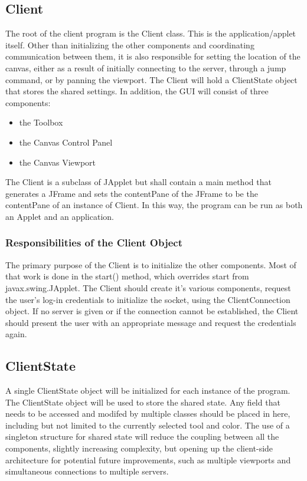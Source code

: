 \documentclass[11pt,oneside,a4paper]{article}
\begin{document}
 \subsection{Client}
  The root of the client program is the Client class. This is the
  application/applet itself. Other than initializing the other components and
  coordinating communication between them, it is also responsible for setting the
  location of the canvas, either as a result of initially connecting to the
  server, through a jump command, or by panning the viewport. The Client will
  hold a ClientState object that stores the shared settings. In addition, the GUI
  will consist of three components:
  \begin{itemize}
   \item the Toolbox
   \item the Canvas Control Panel
   \item the Canvas Viewport
  \end{itemize}
 The Client is a subclass of JApplet but shall contain a main method that
 generates a JFrame and sets the contentPane of the JFrame to be the
 contentPane of an instance of Client. In this way, the program can be run as
 both an Applet and an application.
 
 \subsubsection{Responsibilities of the Client Object}
The primary purpose of the Client is to initialize the other components. Most
of that work is done in the start() method, which overrides start from
javax.swing.JApplet. The Client should create it's various components, request
the user's log-in credentials to initialize the socket, using the
ClientConnection object. If no server is given or if the connection cannot be
established, the Client should present the user with an appropriate message and
request the credentials again.
 \subsection{ClientState}
  A single ClientState object will be initialized for each instance of the
  program. The ClientState object will be used to store the shared state. Any
  field that needs to be accessed and modifed by multiple classes should be
  placed in here, including but not limited to the currently selected tool and
  color. The use of a singleton structure for shared state will reduce the
  coupling between all the components, slightly increasing complexity, but
  opening up the client-side architecture for potential future improvements, such
  as multiple viewports and simultaneous connections to multiple servers.
\end{document}
